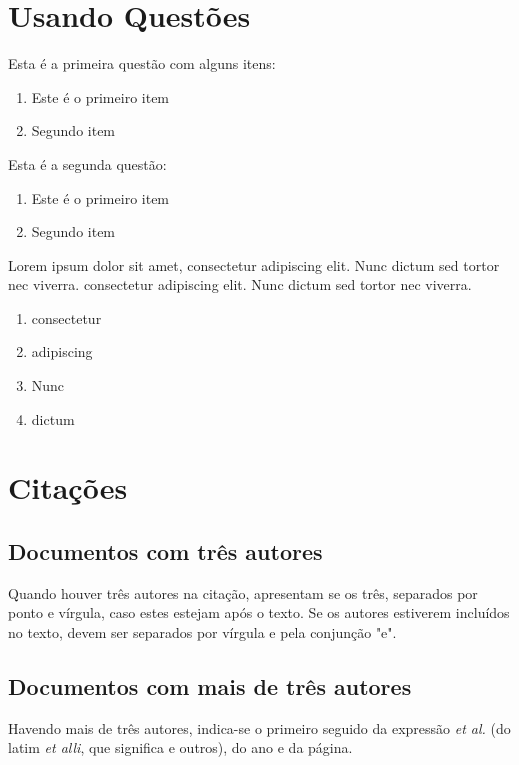 \section{Usando Questões}



\begin{questao}
	\item Esta é a primeira questão com alguns itens:
	\begin{enumerate}
		\item Este é o primeiro item
		\item Segundo item
	\end{enumerate}
	\item Esta é a segunda questão:
	\begin{enumerate}
		\item Este é o primeiro item
		\item Segundo item
	\end{enumerate}
	\item Lorem ipsum dolor sit amet, consectetur adipiscing elit. Nunc dictum sed tortor nec viverra. consectetur adipiscing elit. Nunc dictum sed tortor nec viverra.
	\begin{enumerate}
		\item consectetur
		\item adipiscing
		\item Nunc
		\item dictum
	\end{enumerate}
\end{questao}

\section{Citações}

\subsection{Documentos com três autores}

Quando houver três autores na citação, apresentam se os três, separados por ponto e vírgula, caso estes estejam após o texto. Se os autores estiverem incluídos no texto, devem ser separados por vírgula e pela conjunção "e".


\cite{tresautores}

\subsection{Documentos com mais de três autores}
Havendo mais de três autores, indica-se o primeiro seguido da expressão \textit{et al.} (do latim \textit{et alli}, que significa e outros), do ano e da página.

